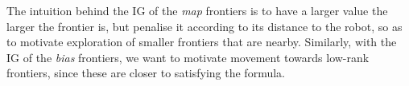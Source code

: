 The intuition behind the IG of the \emph{map} frontiers is to have a larger value the larger the frontier is, but penalise it according to its distance to the robot, so as to motivate exploration of smaller frontiers that are nearby. Similarly, with the IG of the \emph{bias} frontiers, we want to motivate movement towards low-rank frontiers, since these are closer to satisfying the formula.

